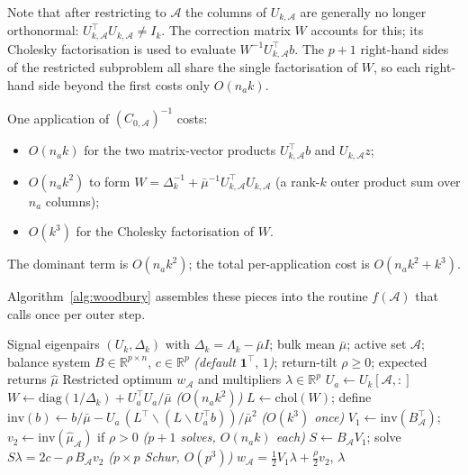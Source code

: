 Note that after restricting to $\mathcal{A}$ the columns of $U_{k,\mathcal{A}}$
are generally no longer orthonormal: $U_{k,\mathcal{A}}^\top U_{k,\mathcal{A}} \neq I_k$.
The correction matrix $W$ accounts for this; its Cholesky factorisation is used
to evaluate $W^{-1}U_{k,\mathcal{A}}^\top b$. The $p+1$ right-hand sides of the
restricted subproblem all share the single factorisation of $W$, so each
right-hand side beyond the first costs only $O(n_a k)$.

\begin{proposition}\label{prop:woodbury_cost}
One application of $(C_{0,\mathcal{A}})^{-1}$ costs:
\begin{itemize}
  \item $O(n_a k)$ for the two matrix-vector products $U_{k,\mathcal{A}}^\top b$
        and $U_{k,\mathcal{A}} z$;
  \item $O(n_a k^2)$ to form $W = \Delta_k^{-1} + \bar\mu^{-1} U_{k,\mathcal{A}}^\top U_{k,\mathcal{A}}$
        (a rank-$k$ outer product sum over $n_a$ columns);
  \item $O(k^3)$ for the Cholesky factorisation of $W$.
\end{itemize}
The dominant term is $O(n_a k^2)$; the total per-application cost is $O(n_a k^2 + k^3)$.
\end{proposition}

Algorithm~\ref{alg:woodbury} assembles these pieces into the routine
$f(\mathcal{A})$ that~\cite[Algorithm~1]{schmelzer2026nncg} calls once per outer
step.

\begin{algorithm}[ht]
\caption{Woodbury inner solve $f(\mathcal{A})$ for the RMT-cleaned correlation}\label{alg:woodbury}
\begin{algorithmic}[1]
\Require Signal eigenpairs $(U_k, \Delta_k)$ with $\Delta_k = \Lambda_k - \bar\mu I$;
         bulk mean $\bar\mu$;
         active set $\mathcal{A}$;
         balance system $B \in \mathbb{R}^{p \times n}$, $c \in \mathbb{R}^p$
         \textit{(default $\mathbf{1}^\top,\, 1$)};
         return-tilt $\rho \geq 0$; expected returns $\hat\mu$
\Ensure  Restricted optimum $w_\mathcal{A}$ and multipliers $\lambda \in \mathbb{R}^p$
\State $U_a \leftarrow U_k[\mathcal{A}, :]$ 
\State $W \leftarrow \mathrm{diag}(1/\Delta_k) + U_a^\top U_a / \bar\mu$
  \hfill\textit{($O(n_a k^2)$)}
\State $L \leftarrow \mathrm{chol}(W)$;\;
       define $\mathrm{inv}(b) \leftarrow b/\bar\mu - U_a\,(L^\top \backslash (L \backslash U_a^\top b)) / \bar\mu^2$
  \hfill\textit{($O(k^3)$ once)}
\State $V_1 \leftarrow \mathrm{inv}(B_\mathcal{A}^\top)$;\;
       $v_2 \leftarrow \mathrm{inv}(\hat\mu_\mathcal{A})$ if $\rho > 0$
  \hfill\textit{($p{+}1$ solves, $O(n_a k)$ each)}
\State $S \leftarrow B_\mathcal{A} V_1$;\; solve $S\lambda = 2c - \rho\,B_\mathcal{A} v_2$
  \hfill\textit{($p \times p$ Schur, $O(p^3)$)}
\State \Return $w_\mathcal{A} = \tfrac12 V_1\lambda + \tfrac{\rho}{2} v_2$,\; $\lambda$
\end{algorithmic}
\end{algorithm}

